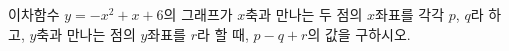 이차함수 $y=-x^2+x+6$의 그래프가 $x$축과 만나는 두 점의 $x$좌표를 각각 $p$, $q$라 하고, $y$축과 만나는 점의 $y$좌표를 $r$라 할 때, $p-q+r$의 값을 구하시오. 
